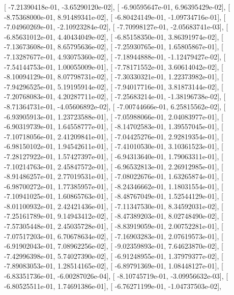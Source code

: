 \documentclass{article}
\begin{document}
       [ -7.21390418e-01,  -3.65290120e-02],
       [ -6.90595647e-01,   6.96395429e-02],
       [ -8.75368000e-01,   8.91489341e-02],
       [ -6.80424149e-01,  -1.09734716e-01],
       [ -7.04960269e-01,  -2.10923284e-02],
       [ -7.70998127e-01,  -2.05683741e-03],
       [ -6.85631012e-01,   4.40434049e-02],
       [ -6.85158350e-01,   3.86391974e-02],
       [ -7.13673608e-01,   8.65795636e-02],
       [ -7.25930765e-01,   1.65805867e-01],
       [ -7.13287677e-01,   4.93075360e-02],
       [ -7.18944888e-01,  -1.12479427e-02],
       [ -7.54144753e-01,   1.00055009e-01],
       [ -7.78171552e-01,   3.60614042e-02],
       [ -8.10094129e-01,   8.07798731e-02],
       [ -7.30330321e-01,   1.22373982e-01],
       [ -7.94296525e-01,   5.19195914e-02],
       [ -7.94017716e-01,   3.81873144e-02],
       [ -7.20768083e-01,   4.20287711e-02],
       [ -7.25683214e-01,  -1.38196738e-02],
       [ -8.71364731e-01,  -4.05606892e-02],
       [ -7.00744666e-01,   6.25815562e-02],
       [ -6.93905913e-01,   1.23723588e-01],
       [ -7.05988066e-01,   2.04083977e-01],
       [ -6.90319739e-01,   1.64558777e-01],
       [ -8.14702583e-01,   1.39557045e-01],
       [ -7.10718056e-01,   2.41209841e-01],
       [ -7.04425276e-01,   2.92819354e-01],
       [ -6.98150102e-01,   1.94542611e-01],
       [ -7.41010530e-01,   3.10361523e-01],
       [ -7.28127922e-01,   1.57427397e-01],
       [ -6.94313640e-01,   1.79063311e-01],
       [ -7.10214763e-01,   2.45847572e-01],
       [ -6.96532813e-01,   2.26912985e-01],
       [ -8.91486257e-01,   2.77019531e-01],
       [ -7.08022676e-01,   1.63265874e-01],
       [ -6.98700272e-01,   1.77385957e-01],
       [ -8.24346662e-01,   1.18031554e-01],
       [ -7.10941025e-01,   1.60865763e-01],
       [ -8.48767049e-01,   1.52544129e-01],
       [ -8.01100932e-01,   2.42421436e-01],
       [ -7.11347530e-01,   8.34592031e-02],
       [ -7.25161789e-01,   9.14943412e-02],
       [ -8.47389203e-01,   8.02748490e-02],
       [ -7.57305448e-01,   2.45035728e-01],
       [ -8.83919059e-01,   2.00752281e-01],
       [ -7.07517203e-01,   6.70678634e-02],
       [ -7.16903283e-01,   2.07619573e-01],
       [ -6.91902043e-01,   7.08962256e-02],
       [ -9.02359893e-01,   7.64623870e-02],
       [ -7.42996398e-01,   5.74027390e-02],
       [ -6.91248955e-01,   1.37979377e-02],
       [ -7.89083053e-01,   1.28514165e-02],
       [ -6.89791369e-01,   1.08448127e-01],
       [ -6.83351736e-01,  -6.00287026e-04],
       [ -8.10745719e-01,  -3.09956632e-03],
       [ -6.80525511e-01,   1.74691386e-01],
       [ -6.76271199e-01,  -1.04737503e-02],
\end{document}
